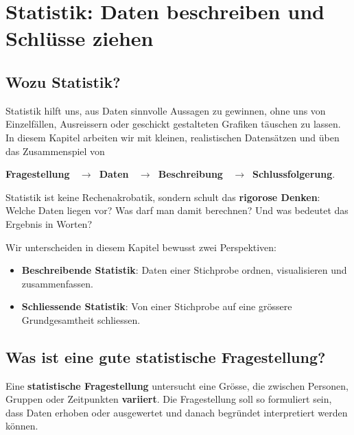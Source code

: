 \chapter{Statistik: Daten beschreiben und Schlüsse ziehen}

\section{Wozu Statistik?}

Statistik hilft uns, aus Daten sinnvolle Aussagen zu gewinnen, ohne uns von Einzelfällen, Ausreissern oder geschickt gestalteten Grafiken täuschen zu lassen.
In diesem Kapitel arbeiten wir mit kleinen, realistischen Datensätzen und üben das Zusammenspiel von
\begin{center}
	\textbf{Fragestellung \ $\rightarrow$\ Daten \ $\rightarrow$\ Beschreibung \ $\rightarrow$\ Schlussfolgerung}.
\end{center}

\begin{myattention}
	Statistik ist keine Rechenakrobatik, sondern schult das \textbf{rigorose Denken}:
	Welche Daten liegen vor? Was darf man damit berechnen? Und was bedeutet das Ergebnis in Worten?
\end{myattention}

\begin{myremark}
	Wir unterscheiden in diesem Kapitel bewusst zwei Perspektiven:
	\begin{itemize}
		\item \textbf{Beschreibende Statistik}: Daten einer Stichprobe ordnen, visualisieren und zusammenfassen.
		\item \textbf{Schliessende Statistik}: Von einer Stichprobe auf eine grössere Grundgesamtheit schliessen.
	\end{itemize}
\end{myremark}

\section{Was ist eine gute statistische Fragestellung?}

\begin{mydefinition}
	Eine \textbf{statistische Fragestellung} untersucht eine Grösse, die zwischen Personen, Gruppen oder Zeitpunkten \textbf{variiert}.
	Die Fragestellung soll so formuliert sein, dass Daten erhoben oder ausgewertet und danach begründet interpretiert werden können.
\end{mydefinition}


